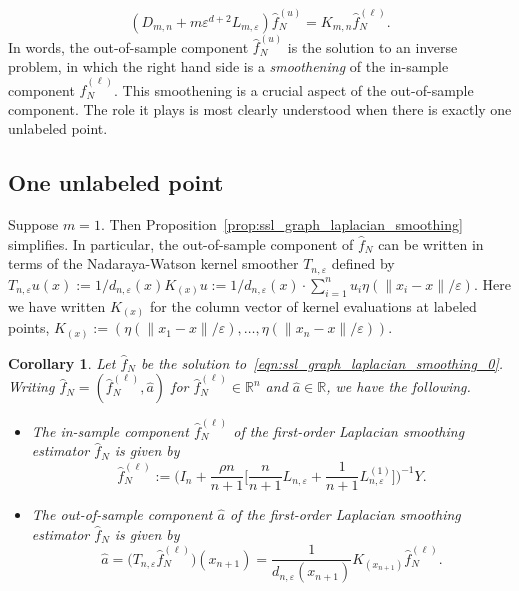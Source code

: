 \documentclass{article}
\newcommand{\Reals}{\mathbb{R}}
\newcommand{\1}{\mathbf{1}}
\newcommand{\wh}[1]{\widehat{#1}}
\theoremstyle{alden}
\theoremstyle{aldenthm}
\newtheorem{corollary}{Corollary}
\theoremstyle{definition}
\theoremstyle{remark}
\begin{document}
\begin{equation*}
(D_{m,n} + m\varepsilon^{d + 2}L_{m,\varepsilon})\wh{f}_N^{(u)} = K_{m,n} \wh{f}_N^{(\ell)}.
\end{equation*}
In words, the out-of-sample component $\wh{f}_N^{(u)}$ is the solution to an inverse problem, in which the right hand side is a \emph{smoothening} of the in-sample component $\wh{f}_N^{(\ell)}$. This smoothening is a crucial aspect of the out-of-sample component. The role it plays is most clearly understood when there is exactly one unlabeled point.

\subsection{One unlabeled point}
Suppose $m = 1$. Then Proposition~\ref{prop:ssl_graph_laplacian_smoothing} simplifies. In particular, the out-of-sample component of $\wh{f}_N$ can be written in terms of the Nadaraya-Watson kernel smoother $T_{n,\varepsilon}$ defined by $T_{n,\varepsilon}u(x) := 1/d_{n,\varepsilon}(x) K_{(x)} u :=  1/d_{n,\varepsilon}(x) \cdot \sum_{i = 1}^{n} u_i \eta(\|x_i - x\|/\varepsilon)$. Here we have written $K_{(x)}$ for the column vector of kernel evaluations at labeled points, $K_{(x)} := (\eta(\|x_1 - x\|/\varepsilon),\ldots,\eta(\|x_n - x\|/\varepsilon))$. 
\begin{corollary}
	\label{cor:ssl_graph_laplacian_smoothing_one_unlabeled}
	Let $\wh{f}_N$ be the solution to~\eqref{eqn:ssl_graph_laplacian_smoothing_0}. Writing $\wh{f}_N = (\wh{f}_N^{(\ell)},\wh{a})$ for $\wh{f}_N^{(\ell)} \in \Reals^n$ and $\wh{a} \in \Reals$, we have the following.
	\begin{itemize}
		\item The in-sample component $\wh{f}_N^{(\ell)}$ of the first-order Laplacian smoothing estimator $\wh{f}_N$ is given by
		\begin{equation}
		\label{eqn:ssl_graph_laplacian_smoothing_one_unlabeled_1}
		\wh{f}_N^{(\ell)} := \biggl(I_n + \frac{\rho n}{n + 1}\biggl[\frac{n}{n + 1}L_{n,\varepsilon} + \frac{1}{n + 1}L_{n,\varepsilon}^{(1)}\biggr]\biggr)^{-1} Y.
		\end{equation}
		\item The out-of-sample component $\wh{a}$ of the first-order Laplacian smoothing estimator $\wh{f}_N$ is given by
		\begin{equation}
		\label{eqn:ssl_graph_laplacian_smoothing_one_unlabeled_2}
		\wh{a} = \bigl(T_{n,\varepsilon}\wh{f}_N^{(\ell)}\bigr)(x_{n + 1}) = \frac{1}{d_{n,\varepsilon}(x_{n + 1})} K_{(x_{n + 1})}\wh{f}_N^{(\ell)}.
		\end{equation}
	\end{itemize}
\end{corollary}
\end{document}
